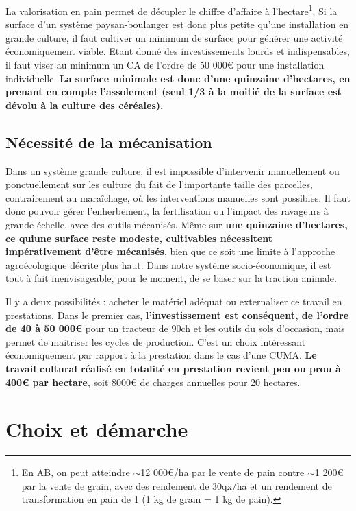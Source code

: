\documentclass{book}
\begin{document}
La valorisation en pain permet de décupler le chiffre d'affaire à l'hectare\footnote{En AB, on peut atteindre $\sim$12 000\euro{}/ha par le vente de pain contre $\sim$1 200\euro{} par la vente de grain, avec des rendement de 30qx/ha et un rendement de transformation en pain de 1 (1 kg de grain = 1 kg de pain).}. Si la surface d'un système paysan-boulanger est donc plus petite qu'une installation en grande culture, il faut cultiver un minimum de surface pour générer une activité économiquement viable. Etant donné des investissements lourds et indispensables, il faut viser au minimum un CA de l'ordre de 50 000\euro{} pour une installation individuelle. \textbf{La surface minimale est donc d'une quinzaine d'hectares, en prenant en compte l'assolement (seul 1/3 à la moitié de la surface est dévolu à la culture des céréales).} 

\subsection{Nécessité de la mécanisation}

Dans un système grande culture, il est impossible d’intervenir manuellement ou ponctuellement sur les culture du fait de l’importante taille des parcelles, contrairement au maraîchage, où les interventions manuelles sont possibles. Il faut donc pouvoir gérer l’enherbement, la fertilisation ou l’impact des ravageurs à grande échelle, avec des outils mécanisés. Même sur \textbf{une quinzaine d'hectares, ce quiune surface reste modeste, cultivables nécessitent impérativement d'être mécanisés}, bien que ce soit une limite à l'approche agroécologique décrite plus haut. Dans notre système socio-économique, il est tout à fait inenvisageable, pour le moment, de se baser sur la traction animale. 

Il y a deux possibilités : acheter le matériel adéquat ou externaliser ce travail en prestations. Dans le premier cas, \textbf{l'investissement est conséquent, de l'ordre de 40 à 50 000\euro{}} pour un tracteur de 90ch et les outils du sols d'occasion, mais permet de maitriser les cycles de production. C'est un choix intéressant économiquement par rapport à la prestation dans le cas d'une CUMA. \textbf{Le travail cultural réalisé en totalité en prestation revient peu ou prou à 400\euro{} par hectare}, soit 8000\euro{} de charges annuelles pour 20 hectares.

\section{Choix et démarche}
\end{document}
